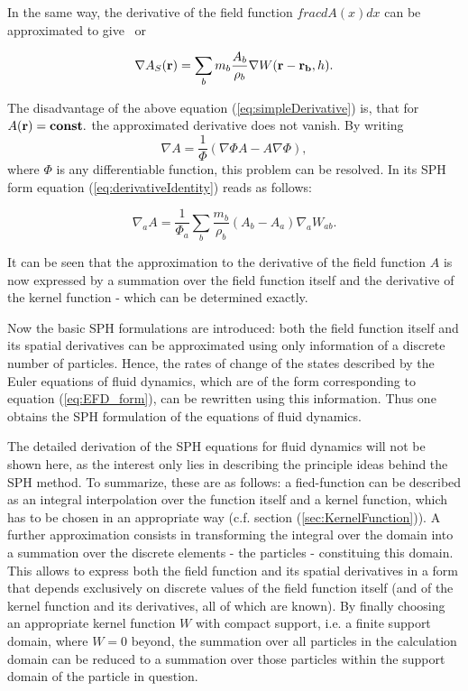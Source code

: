 \documentclass{report}
\begin{document}
In the same way, the derivative of the field function $frac{dA(x)}{dx}$ can be
approximated to give~\cite{Monaghan2005} or \cite{Liu2003} 

\begin{equation}
\label{eq:simpleDerivative}
\nabla A_S({\bf r})=\sum_b m_b \frac{A_b}{\rho_b}\nabla W({\bf r}-{\bf r_b},h).
\end{equation}

The disadvantage of the above equation (\ref{eq:simpleDerivative}) is, that for
$A(\bf{r})=const.$ the approximated derivative does not vanish. By writing 
\begin{equation}
\label{eq:derivativeIdentity}
\nabla A = \frac{1}{\Phi}(\nabla {\Phi A}-A\nabla \Phi),
\end{equation}
where $\Phi$ is any differentiable function, this problem can be resolved. In its
SPH form  equation (\ref{eq:derivativeIdentity}) reads as follows:

\begin{equation}
\nabla_a A = \frac{1}{\Phi_a}\sum_b \frac{m_b}{\rho_b}(A_b-A_a)\nabla_a W_{ab}.
\end{equation}

It can be seen that the approximation to the derivative of the
field function $A$ is now expressed by a summation over the field function itself
and the derivative of the kernel function - which can be determined exactly.

Now the basic SPH formulations are introduced: both the field function
itself and its spatial derivatives can be approximated using only information 
of a discrete number of particles. Hence, the rates of change of
the states described by the Euler equations of fluid dynamics, which are of the form
corresponding to equation (\ref{eq:EFD_form}), can be rewritten using this information. Thus 
one obtains the SPH formulation of the equations of fluid dynamics.

The detailed derivation of the SPH equations for fluid dynamics will not be shown here, as the
interest  only lies in describing the principle ideas behind the SPH
method. To summarize, these are as follows: a fied-function can be
described as an integral interpolation over the function itself and a kernel
function, which has to be chosen in an appropriate way (c.f. section (\ref{sec:KernelFunction})). A further
approximation consists in transforming the integral over the domain into a
summation over the discrete elements - the particles - constituing this domain. 
This allows to express both
the field function and its spatial derivatives in a form  
that depends exclusively on discrete values
of the field function itself (and of the kernel function and its derivatives, 
all of which are known). By finally choosing an appropriate kernel function $W$ with
compact support, i.e. a finite support domain, where $W=0$ beyond, the summation over all particles in the calculation domain can be reduced
to a summation over those particles within the support domain of the particle
in question.
\end{document}
